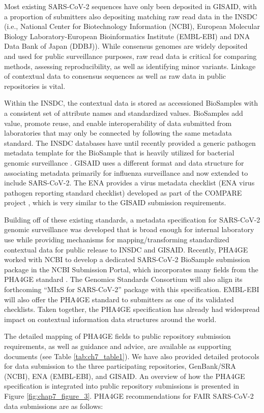 Most existing SARS-CoV-2 sequences have only been deposited in GISAID, with a proportion of submitters also depositing matching raw read data in the INSDC (i.e., National Center for Biotechnology Information (NCBI), European Molecular Biology Laboratory-European Bioinformatics Institute (EMBL-EBI) and DNA Data Bank of Japan (DDBJ)). While consensus genomes are widely deposited and used for public surveillance purposes, raw read data is critical for comparing methods, assessing reproducibility, as well as identifying minor variants. Linkage of contextual data to consensus sequences as well as raw data in public repositories is vital. 

Within the INSDC, the contextual data is stored as accessioned BioSamples \cite{barrett_bioproject_2012} with a consistent set of attribute names and standardized values. BioSamples add value, promote reuse, and enable interoperability of data submitted from laboratories that may only be connected by following the same metadata standard. The INSDC databases have until recently provided a generic pathogen metadata template for the BioSample that is heavily utilized for bacterial genomic surveillance \cite{noauthor_home_nodate}. GISAID uses a different format and data structure for associating metadata primarily for influenza surveillance and now extended to include SARS-CoV-2. The ENA provides a virus metadata checklist (ENA virus pathogen reporting standard checklist) developed as part of the COMPARE project \cite{compare_home_nodate}, which is very similar to the GISAID submission requirements.

Building off of these existing standards, a metadata specification for SARS-CoV-2 genomic surveillance was developed that is broad enough for internal laboratory use while providing mechanisms for mapping/transforming standardized contextual data for public release to INSDC and GISAID. Recently, PHA4GE worked with NCBI to develop a dedicated SARS-CoV-2 BioSample submission package in the NCBI Submission Portal, which incorporates many fields from the PHA4GE standard \cite{staff_dedicated_2021}. The Genomics Standards Consortium will also align its forthcoming “MIxS for SARS-CoV-2” package with this specification. EMBL-EBI will also offer the PHA4GE standard to submitters as one of its validated checklists. Taken together, the PHA4GE specification has already had widespread impact on contextual information data structures around the world.

The detailed mapping of PHA4GE fields to public repository submission requirements, as well as guidance and advice, are available as supporting documents (see Table \ref{tab:ch7_table1}). We have also provided detailed protocols for data submission to the three participating repositories, GenBank/SRA (NCBI), ENA (EMBL-EBI), and GISAID. An overview of how the PHA4GE specification is integrated into public repository submissions is presented in Figure \ref{fig:chap7_figure_3}. PHA4GE recommendations for FAIR SARS-CoV-2 data submissions are as follows:

